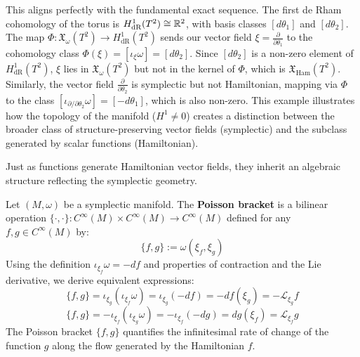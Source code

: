 \begin{example}
This aligns perfectly with the fundamental exact sequence. The first de Rham cohomology of the torus is $H^1_{\text{dR}}(T^2) \cong \mathbb{R}^2$, with basis classes $[d\theta_1]$ and $[d\theta_2]$. The map $\Phi: \mathfrak{X}_{\omega}(T^2) \to H^1_{\text{dR}}(T^2)$ sends our vector field $\xi = \frac{\partial}{\partial\theta_1}$ to the cohomology class $\Phi(\xi) = [\iota_\xi \omega] = [d\theta_2]$. Since $[d\theta_2]$ is a non-zero element of $H^1_{\text{dR}}(T^2)$, $\xi$ lies in $\mathfrak{X}_{\omega}(T^2)$ but not in the kernel of $\Phi$, which is $\mathfrak{X}_{\mathrm{Ham}}(T^2)$. Similarly, the vector field $\frac{\partial}{\partial\theta_2}$ is symplectic but not Hamiltonian, mapping via $\Phi$ to the class $[\iota_{\partial/\partial\theta_2}\omega] = [-d\theta_1]$, which is also non-zero. This example illustrates how the topology of the manifold ($H^1 \neq 0$) creates a distinction between the broader class of structure-preserving vector fields (symplectic) and the subclass generated by scalar functions (Hamiltonian).
\end{example}

Just as functions generate Hamiltonian vector fields, they inherit an algebraic structure reflecting the symplectic geometry.

\begin{definition}
Let $(M, \omega)$ be a symplectic manifold. The \textbf{Poisson bracket} is a bilinear operation $\{\cdot, \cdot\}: C^\infty(M) \times C^\infty(M) \to C^\infty(M)$ defined for any $f, g \in C^\infty(M)$ by:
\[
\{f, g\} := \omega(\xi_f, \xi_g)
\]
Using the definition $\iota_{\xi_f}\omega = -df$ and properties of contraction and the Lie derivative, we derive equivalent expressions:
\[
\{f, g\} = \iota_{\xi_g}(\iota_{\xi_f} \omega) = \iota_{\xi_g}(-df) = -df(\xi_g) = -\mathcal{L}_{\xi_g} f
\]
\[
\{f, g\} = -\iota_{\xi_f}(\iota_{\xi_g} \omega) = -\iota_{\xi_f}(-dg) = dg(\xi_f) = \mathcal{L}_{\xi_f} g
\]
The Poisson bracket $\{f, g\}$ quantifies the infinitesimal rate of change of the function $g$ along the flow generated by the Hamiltonian $f$.
\end{definition}

